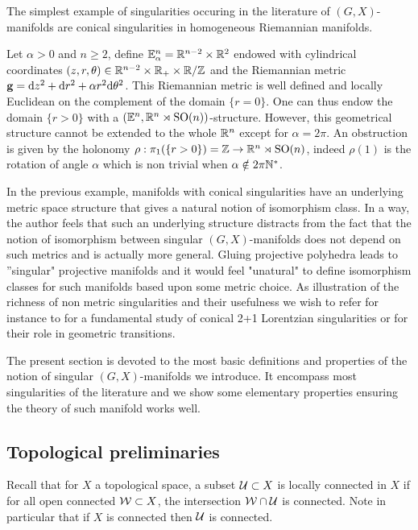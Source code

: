 The simplest example of singularities occuring in the literature of $(G,X)$-manifolds are conical singularities in homogeneous Riemannian manifolds. 
\begin{ex} \label{ex:conical}Let $\alpha>0$ and $n\geq 2$, define $\mathbb E_\alpha^n = \mathbb R^{n-2}\times \mathbb R^2$ endowed with cylindrical coordinates $(z,r,\theta) \in \mathbb R^{n-2}\times \mathbb R_+\times \mathbb R/\mathbb{Z}$ and the Riemannian metric $\mathbf{g} = \mathrm{d} z^2+\mathrm{d} r^2 + \alpha r^2\mathrm{d} \theta^2$. 
This Riemannian metric is well defined and locally Euclidean on the complement of the domain $\{r=0\}$. 
One can thus endow the domain $\{r>0\}$ with a $(\mathbb E^n,\mathbb R^n \rtimes \mathrm{SO}(n))$-structure. However, this geometrical structure cannot be extended to the whole $\mathbb R^n$ except for $\alpha=2\pi$. An obstruction is given by the holonomy $\rho:\pi_1(\{r>0\})=\mathbb{Z} \rightarrow \mathbb R^n\rtimes \mathrm{SO}(n)$, indeed $\rho(1)$ is the rotation of angle $\alpha$ which is non trivial  when $\alpha\notin  2\pi\mathbb{N}^*$.
\end{ex}
In the previous example, manifolds with conical singularities have an underlying metric space structure that gives a natural notion of isomorphism class. In a way, the author feels that such an underlying structure distracts from the fact that the notion of isomorphism between singular $(G,X)$-manifolds does not depend on such metrics and is actually more general. Gluing projective polyhedra leads to ''singular" projective manifolds and it would feel "unatural" to define isomorphism classes for such manifolds based upon some metric choice. As illustration of the richness of non metric singularities and their usefulness we wish to refer for instance to \cite{Particules_1} for a fundamental study of conical 2+1 Lorentzian singularities or \cite{MR3190306,MR3814342} for their role in geometric transitions. 



The present section is devoted to the most basic definitions and properties of the notion of singular $(G,X)$-manifolds we introduce.  It encompass most singularities of the literature and we show some elementary properties ensuring the theory of such manifold works well. 




\subsection{Topological preliminaries}

Recall that for $X$ a topological space, a subset $\mathcal{U}\subset X$ is locally connected in $X$ if for all open connected $\mathcal W\subset X$, the intersection $\mathcal W\cap \mathcal{U}$ is connected. Note in particular that if $X$ is connected then $\mathcal{U}$ is connected.

